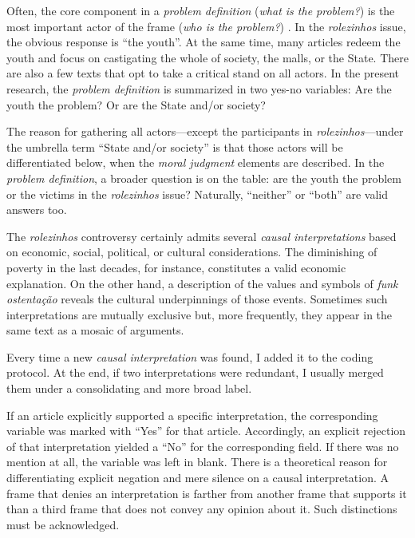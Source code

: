 Often, the core component in a \emph{problem definition} (\emph{what is the problem?}) is the most important actor of the frame (\emph{who is the problem?}) \autocite[266]{matthes2008content}. In the \emph{rolezinhos} issue, the obvious response is \enquote{the youth}. At the same time, many articles redeem the youth and focus on castigating the whole of society, the malls, or the State. There are also a few texts that opt to take a critical stand on all actors. In the present research, the \emph{problem definition} is summarized in two yes-no variables: Are the youth the problem? Or are the State and/or society?

The reason for gathering all actors---except the participants in \emph{rolezinhos}---under the umbrella term \enquote{State and/or society} is that those actors will be differentiated below, when the \emph{moral judgment} elements are described. In the \emph{problem definition}, a broader question is on the table: are the youth the problem or the victims in the \emph{rolezinhos} issue? Naturally, \enquote{neither} or \enquote{both} are valid answers too.

The \emph{rolezinhos} controversy certainly admits several \emph{causal interpretations} based on economic, social, political, or cultural considerations. The diminishing of poverty in the last decades, for instance, constitutes a valid economic explanation. On the other hand, a description of the values and symbols of \emph{funk ostentação} reveals the cultural underpinnings of those events. Sometimes such interpretations are mutually exclusive but, more frequently, they appear in the same text as a mosaic of arguments.

Every time a new \emph{causal interpretation} was found, I added it to the coding protocol. At the end, if two interpretations were redundant, I usually merged them under a consolidating and more broad label.

If an article explicitly supported a specific interpretation, the corresponding variable was marked with \enquote{Yes} for that article. Accordingly, an explicit rejection of that interpretation yielded a \enquote{No} for the corresponding field. If there was no mention at all, the variable was left in blank. There is a theoretical reason for differentiating explicit negation and mere silence on a causal interpretation. A frame that denies an interpretation is farther from another frame that supports it than a third frame that does not convey any opinion about it. Such distinctions must be acknowledged.

